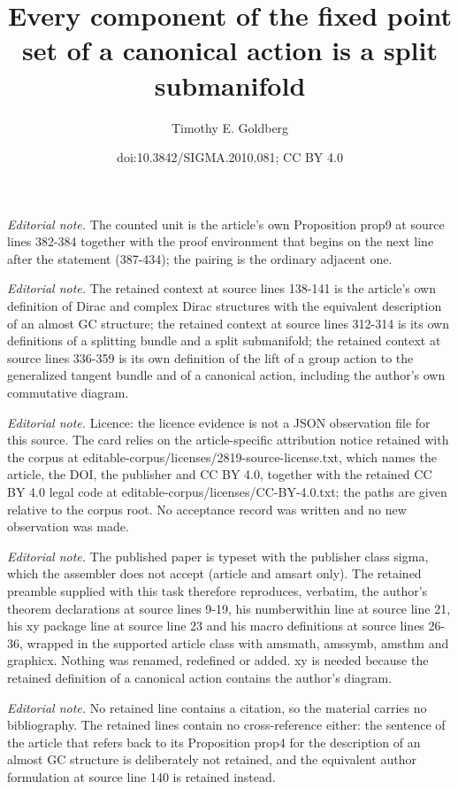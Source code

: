 \documentclass{article}
\title{Every component of the fixed point set of a canonical action is a split submanifold}
\author{Timothy E. Goldberg}
\date{doi:10.3842/SIGMA.2010.081; CC BY 4.0}
\numberwithin{equation}{section}
\begin{document}
\maketitle
\noindent\textit{Editorial note.} The counted unit is the article's own Proposition prop9 at source lines 382-384 together with the proof environment that begins on the next line after the statement (387-434); the pairing is the ordinary adjacent one.\par\medskip
\noindent\textit{Editorial note.} The retained context at source lines 138-141 is the article's own definition of Dirac and complex Dirac structures with the equivalent description of an almost GC structure; the retained context at source lines 312-314 is its own definitions of a splitting bundle and a split submanifold; the retained context at source lines 336-359 is its own definition of the lift of a group action to the generalized tangent bundle and of a canonical action, including the author's own commutative diagram.\par\medskip
\noindent\textit{Editorial note.} Licence: the licence evidence is not a JSON observation file for this source. The card relies on the article-specific attribution notice retained with the corpus at editable-corpus/licenses/2819-source-license.txt, which names the article, the DOI, the publisher and CC BY 4.0, together with the retained CC BY 4.0 legal code at editable-corpus/licenses/CC-BY-4.0.txt; the paths are given relative to the corpus root. No acceptance record was written and no new observation was made.\par\medskip
\noindent\textit{Editorial note.} The published paper is typeset with the publisher class sigma, which the assembler does not accept (article and amsart only). The retained preamble supplied with this task therefore reproduces, verbatim, the author's theorem declarations at source lines 9-19, his numberwithin line at source line 21, his xy package line at source line 23 and his macro definitions at source lines 26-36, wrapped in the supported article class with amsmath, amssymb, amsthm and graphicx. Nothing was renamed, redefined or added. xy is needed because the retained definition of a canonical action contains the author's diagram.\par\medskip
\noindent\textit{Editorial note.} No retained line contains a citation, so the material carries no bibliography. The retained lines contain no cross-reference either: the sentence of the article that refers back to its Proposition prop4 for the description of an almost GC structure is deliberately not retained, and the equivalent author formulation at source line 140 is retained instead.\par\medskip
\end{document}

